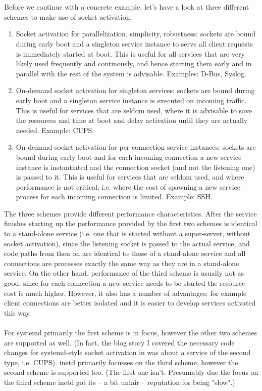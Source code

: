 \documentclass[titlepage]{article}
\begin{document}
\\
\\
Before we continue with a concrete example, let's have a look at three different schemes to make use of socket activation:
\begin{enumerate}
\item Socket activation for parallelization, simplicity, robustness: sockets are bound during early boot and a singleton service instance to serve all client requests is immediately started at boot. This is useful for all services that are very likely used frequently and continously, and hence starting them early and in parallel with the rest of the system is advisable. Examples: D-Bus, Syslog.
\item On-demand socket activation for singleton services: sockets are bound during early boot and a singleton service instance is executed on incoming traffic. This is useful for services that are seldom used, where it is advisable to save the resources and time at boot and delay activation until they are actually needed. Example: CUPS.
\item On-demand socket activation for per-connection service instances: sockets are bound during early boot and for each incoming connection a new service instance is instantiated and the connection socket (and not the listening one) is passed to it. This is useful for services that are seldom used, and where performance is not critical, i.e. where the cost of spawning a new service process for each incoming connection is limited. Example: SSH.
\end{enumerate}
The three schemes provide different performance characteristics. After the service finishes starting up the performance provided by the first two schemes is identical to a stand-alone service (i.e. one that is started without a super-server, without socket activation), since the listening socket is passed to the actual service, and code paths from then on are identical to those of a stand-alone service and all connections are processes exactly the same way as they are in a stand-alone service. On the other hand, performance of the third scheme is usually not as good: since for each connection a new service needs to be started the resource cost is much higher. However, it also has a number of advantages: for example client connections are better isolated and it is easier to develop services activated this way.
\\
\\
For systemd primarily the first scheme is in focus, however the other two schemes are supported as well. (In fact, the blog story I covered the necessary code changes for systemd-style socket activation in was about a service of the second type, i.e. CUPS). inetd primarily focusses on the third scheme, however the second scheme is supported too. (The first one isn't. Presumably due the focus on the third scheme inetd got its -- a bit unfair -- reputation for being "slow".)
\end{document}
